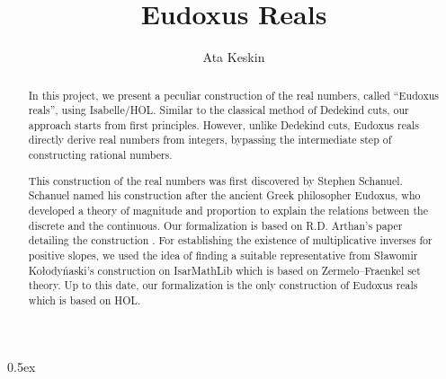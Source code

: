 \documentclass[11pt,a4paper]{article}
\begin{document}
\title{Eudoxus Reals}
\author{Ata Keskin}

\maketitle

\begin{abstract}
In this project, we present a peculiar construction of the real numbers, called ``Eudoxus reals'', using Isabelle/HOL. Similar to the classical method of Dedekind cuts, our approach starts from first principles. However, unlike Dedekind cuts, Eudoxus reals directly derive real numbers from integers, bypassing the intermediate step of constructing rational numbers.

This construction of the real numbers was first discovered by Stephen Schanuel. Schanuel named his construction after the ancient Greek philosopher Eudoxus, who developed a theory of magnitude and proportion to explain the relations between the discrete and the continuous. Our formalization is based on R.D. Arthan's paper detailing the construction \cite{arthan2004eudoxus}. For establishing the existence of multiplicative inverses for positive slopes, we used the idea of finding a suitable representative from S\l awomir Ko\l ody\'naski's construction on IsarMathLib which is based on Zermelo--Fraenkel set theory. Up to this date, our formalization is the only construction of Eudoxus reals which is based on HOL.
\end{abstract}

\tableofcontents
\pagebreak
\parindent 0pt\parskip 0.5ex





\end{document}
